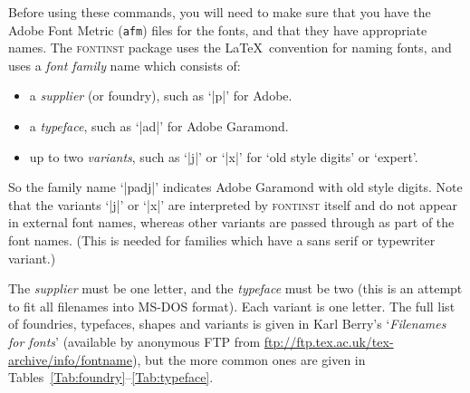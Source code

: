 \documentclass[a4paper]{ltxguide}
\newcommand*{\setfilename}[1]{\texttt{#1}}
\newcommand*{\setpackagename}[1]{\textsc{#1}}
\newcommand{\fontinst}{\setpackagename{font\-inst}\xspace}
\newcommand{\afm}{\setfilename{afm}\xspace}
\begin{document}
Before using these commands, you will need to make sure that you
have the Adobe Font Metric (\afm) files for the fonts, and that
they have appropriate names.  The \fontinst package uses the
\LaTeX\ convention for naming fonts, and uses a \emph{font family}
name which consists of:
\begin{itemize}
\item a \emph{supplier} (or foundry), such as `|p|' for Adobe.
\item a \emph{typeface}, such as `|ad|' for Adobe Garamond.
\item up to two \emph{variants}, such as `|j|' or `|x|' for `old
  style digits' or `expert'.
\end{itemize}
So the family name `|padj|' indicates Adobe Garamond with old
style digits.  Note that the variants `|j|' or `|x|' are
interpreted by \fontinst itself and do not appear in external font
names, whereas other variants are passed through as part of the
font names.  (This is needed for families which have a sans serif
or typewriter variant.)

The \emph{supplier} must be one letter, and the \emph{typeface}
must be two (this is an attempt to fit all filenames into MS-DOS
format).  Each variant is one letter.  The full list of foundries,
typefaces, shapes and variants is given in Karl Berry's
`\emph{Filenames for fonts}' (available by anonymous FTP from
\url{ftp://ftp.tex.ac.uk/tex-archive/info/fontname}), but the more
common ones are given in
Tables~\ref{Tab:foundry}--\ref{Tab:typeface}.
\end{document}
